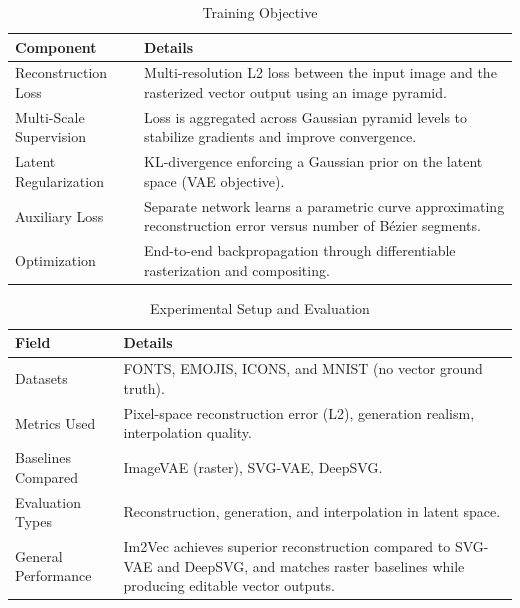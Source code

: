\begin{table}[h!]
\centering
\caption{Training Objective}
\begin{tabular}{|l|p{10cm}|}
\hline
\textbf{Component} & \textbf{Details} \\ \hline

Reconstruction Loss &
Multi-resolution L2 loss between the input image and the rasterized vector output using an image pyramid. \\ \hline

Multi-Scale Supervision &
Loss is aggregated across Gaussian pyramid levels to stabilize gradients and improve convergence. \\ \hline

Latent Regularization &
KL-divergence enforcing a Gaussian prior on the latent space (VAE objective). \\ \hline

Auxiliary Loss &
Separate network learns a parametric curve approximating reconstruction error versus number of Bézier segments. \\ \hline

Optimization &
End-to-end backpropagation through differentiable rasterization and compositing. \\ \hline

\end{tabular}
\end{table}



\begin{table}[h!]
\centering
\caption{Experimental Setup and Evaluation}
\begin{tabular}{|l|p{10cm}|}
\hline
\textbf{Field} & \textbf{Details} \\ \hline

Datasets &
FONTS, EMOJIS, ICONS, and MNIST (no vector ground truth). \\ \hline

Metrics Used &
Pixel-space reconstruction error (L2), generation realism, interpolation quality. \\ \hline

Baselines Compared &
ImageVAE (raster), SVG-VAE, DeepSVG. \\ \hline

Evaluation Types &
Reconstruction, generation, and interpolation in latent space. \\ \hline

General Performance &
Im2Vec achieves superior reconstruction compared to SVG-VAE and DeepSVG, and matches raster baselines while producing editable vector outputs. \\ \hline

\end{tabular}
\end{table}


